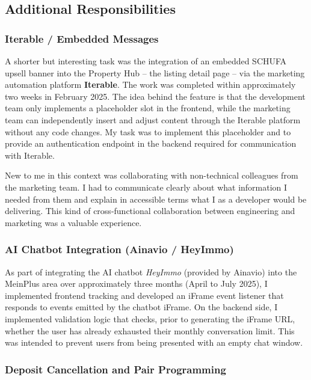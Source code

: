 \documentclass[a4paper, 12pt]{article}
\begin{document}
\subsection{Additional Responsibilities}

\subsubsection*{Iterable / Embedded Messages}

A shorter but interesting task was the integration of an embedded SCHUFA upsell banner
into the Property Hub -- the listing detail page -- via the marketing automation
platform \textbf{Iterable}. The work was completed within approximately two weeks in
February 2025. The idea behind the feature is that the development team
only implements a placeholder slot in the frontend, while the marketing team can
independently insert and adjust content through the Iterable platform without any code
changes. My task was to implement this placeholder and to provide an authentication
endpoint in the backend required for communication with Iterable.

New to me in this context was collaborating with non-technical colleagues from the
marketing team. I had to communicate clearly about what information I needed from them
and explain in accessible terms what I as a developer would be delivering. This kind
of cross-functional collaboration between engineering and marketing was a valuable
experience.

\subsubsection*{AI Chatbot Integration (Ainavio / HeyImmo)}

As part of integrating the AI chatbot \emph{HeyImmo} (provided by Ainavio) into the
MeinPlus area over approximately three months (April to July 2025), I implemented frontend tracking and developed an iFrame event listener
that responds to events emitted by the chatbot iFrame. On the backend side, I
implemented validation logic that checks, prior to generating the iFrame URL, whether
the user has already exhausted their monthly conversation limit. This was intended to
prevent users from being presented with an empty chat window.

\subsubsection*{Deposit Cancellation and Pair Programming}
\end{document}

